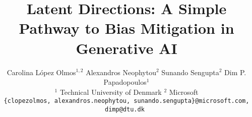 \documentclass[10pt,twocolumn,letterpaper]{article}
\title{Latent Directions: A Simple Pathway to Bias Mitigation in Generative AI}
\author{Carolina López Olmos$^{1,2}$ \quad 
Alexandros Neophytou$^{2}$ \quad 
Sunando Sengupta$^{2}$ \quad 
Dim P. Papadopoulos$^{1}$ \quad \\
$^1$ Technical University of Denmark \quad $^2$ Microsoft \\
{\tt\small  \{clopezolmos, alexandros.neophytou, sunando.sengupta\}@microsoft.com, dimp@dtu.dk
} }
\begin{document}
\maketitle
    






{
    \small
    
    
}

%
\end{document}
